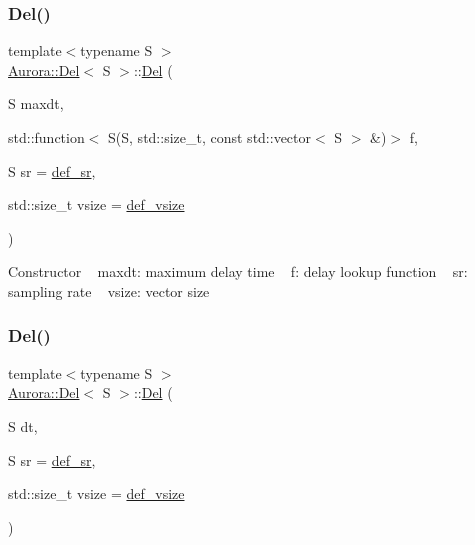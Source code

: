 \subsubsection{\texorpdfstring{Del()}{Del()}\hspace{0.1cm}{\footnotesize\ttfamily [1/2]}}
{\footnotesize\ttfamily template$<$typename S $>$ \\
\hyperlink{class_aurora_1_1_del}{Aurora\+::\+Del}$<$ S $>$\+::\hyperlink{class_aurora_1_1_del}{Del} (\begin{DoxyParamCaption}\item[{S}]{maxdt,  }\item[{std\+::function$<$ S(S, std\+::size\+\_\+t, const std\+::vector$<$ S $>$ \&)$>$}]{f,  }\item[{S}]{sr = {\ttfamily \hyperlink{namespace_aurora_ad49263d809bea98dd422e95bc91bc03e}{def\+\_\+sr}},  }\item[{std\+::size\+\_\+t}]{vsize = {\ttfamily \hyperlink{namespace_aurora_afaaddf667a06e7ce23c667a8b7295263}{def\+\_\+vsize}} }\end{DoxyParamCaption})\hspace{0.3cm}{\ttfamily [inline]}}

Constructor ~\newline
maxdt\+: maximum delay time ~\newline
f\+: delay lookup function ~\newline
sr\+: sampling rate ~\newline
vsize\+: vector size \mbox{\label{class_aurora_1_1_del_ae7ee559e909a215a6d8248d9c9a0ced8}} 
\subsubsection{\texorpdfstring{Del()}{Del()}\hspace{0.1cm}{\footnotesize\ttfamily [2/2]}}
{\footnotesize\ttfamily template$<$typename S $>$ \\
\hyperlink{class_aurora_1_1_del}{Aurora\+::\+Del}$<$ S $>$\+::\hyperlink{class_aurora_1_1_del}{Del} (\begin{DoxyParamCaption}\item[{S}]{dt,  }\item[{S}]{sr = {\ttfamily \hyperlink{namespace_aurora_ad49263d809bea98dd422e95bc91bc03e}{def\+\_\+sr}},  }\item[{std\+::size\+\_\+t}]{vsize = {\ttfamily \hyperlink{namespace_aurora_afaaddf667a06e7ce23c667a8b7295263}{def\+\_\+vsize}} }\end{DoxyParamCaption})\hspace{0.3cm}{\ttfamily [inline]}}

